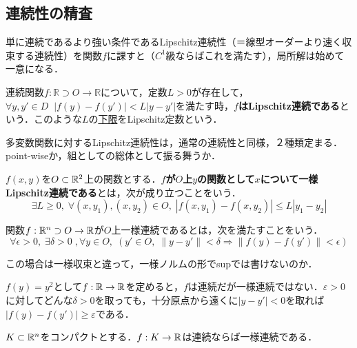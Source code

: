 \documentclass[uplatex,dvipdfmx]{jsreport}
\begin{document}
\subsection{連続性の精査}
単に連続であるより強い条件であるLipschitz連続性（＝線型オーダーより速く収束する連続性）を関数$f$に課すと（$C^1$級ならばこれを満たす），局所解は始めて一意になる．
\begin{definition}
    連続関数$f:\mathbb{R}\supset O \to\mathbb{R}$について，定数$L>0$が存在して，$\forall y,y'\in D\;\; |f(y)-f(y')|<L|y-y'|$を満たす時，\textbf{$f$はLipschitz連続である}という．このような$L$の\underline{下限}をLipschitz定数という．
\end{definition}
多変数関数に対するLipschitz連続性は，通常の連続性と同様，２種類定まる．point-wiseか，組としての総体として振る舞うか．
\begin{definition}
    $f(x,y)$を$O\subset\mathbb{R}^2$上の関数とする．\textbf{$f$が$O$上$y$の関数として$x$について一様Lipschitz連続である}とは，次が成り立つことをいう．
    \[ \exists L\ge 0,\;\forall (x,y_1),(x,y_2)\in O,\; |f(x,y_1)-f(x,y_2)|\le L|y_1-y_2| \]
\end{definition}
\begin{definition}関数$f:\mathbb{R}^n\supset O\to\mathbb{R}$が$O$上一様連続であるとは，次を満たすことをいう．
    \[\forall\epsilon>0,\;\exists\delta>0\;,\forall y\in O,\;(y'\in O,\;\|y-y'\|<\delta\Rightarrow\|f(y)-f(y')\|<\epsilon)\]
\end{definition}
\begin{remark}
    この場合は一様収束と違って，一様ノルムの形でsupでは書けないのか．
\end{remark}
\begin{example}
    $f(y)=y^2$として$f:\mathbb{R}\to\mathbb{R}$を定めると，$f$は連続だが一様連続ではない．$\varepsilon>0$に対してどんな$\delta>0$を取っても，十分原点から遠くに$|y-y'|< 0$を取れば$|f(y)-f(y')|\ge\varepsilon$である．
\end{example}
\begin{theorem}
    $K\subset\mathbb{R}^n$をコンパクトとする．$f:K\to\mathbb{R}$は連続ならば一様連続である．
\end{theorem}
\end{document}
